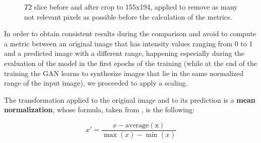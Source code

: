\begin{figure}[H]
  \centering
  \hspace{1.6cm}
  \caption[$T2$ slice before and after crop to 155x194]{$T2$ slice before and after crop to 155x194, applied to remove as many not relevant pixels as possible before the calculation of the metrics.}
  \label{fig:before_after_crop}
\end{figure}

\vspace{5mm} %
In order to obtain consistent results during the comparison and avoid to compute a metric between an original image that has intensity values ranging from 0 to 1 and a predicted image with a different range, happening especially during the evaluation of the model in the first epochs of the training (while at the end of the training the \ac{GAN} learns to synthesize images that lie in the same normalized range of the input image), we proceeded to apply a scaling.

The transformation applied to the original image and to its prediction is a \textbf{mean normalization}, whose formula, taken from \cite{mean_norm}, is the following:

\begin{equation} \label{eq:mean_normalization}
x' = \dfrac{x - \mathrm{average(x)}}{\max(x) - \min(x)}
\end{equation}

